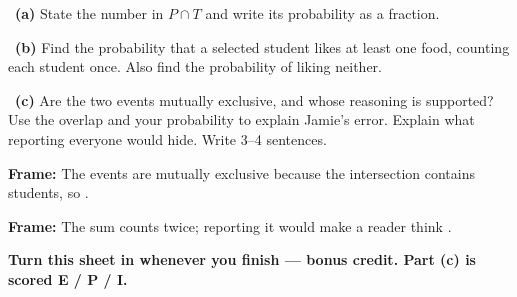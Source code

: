 \documentclass[11pt]{article}
\begin{document}
~\textbf{(a)} State the number in $P\cap T$ and write its probability as a fraction.\par
\workspace{0.7in}

~\textbf{(b)} Find the probability that a selected student likes at least one food, counting each student once. Also find the probability of liking neither.\par
\workspace{1.3in}

~\textbf{(c)} Are the two events mutually exclusive, and whose reasoning is supported? Use the overlap and your probability to explain Jamie's error. Explain what reporting everyone would hide. Write 3--4 sentences.\par
\workspace{2.0in}

\begin{sentenceframebox}\raggedright\textbf{Frame:} The events are \blank[1.0in] mutually exclusive because the intersection contains \blank[0.6in] students, so \blank[2.0in].\end{sentenceframebox}

\begin{sentenceframebox}\raggedright\textbf{Frame:} The sum \blank[1.0in] counts \blank[2.5in] twice; reporting it would make a reader think \blank[2.4in].\end{sentenceframebox}

\textbf{Turn this sheet in whenever you finish --- bonus credit. Part (c) is scored E / P / I.}\par
\end{document}
